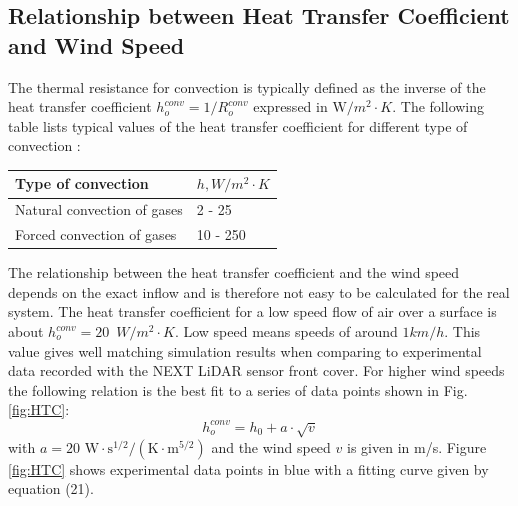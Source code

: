 \subsection{Relationship between Heat Transfer Coefficient and Wind Speed}\label{chapter:windspeedrelation}
The thermal resistance for convection is typically defined as the inverse of the heat transfer coefficient \(h_o^{conv} = 1/R_o^{conv}\) expressed in \(\mathrm{W}/m^2\cdot K\). The following table lists typical values of the heat transfer coefficient for different type of convection \cite{Cengel2002}: 

\begin{table} [H]
\centering
\color{B}
\begin{tabular} [h] {  p{50mm} p{27mm} }
Type of convection & $h, \unit{W/{m^2\cdot K}}$ \\ \hline
Natural convection of gases & 2 - 25 \\ 
Forced convection of gases & 10 - 250 
\end{tabular}
\end{table}
The relationship between the heat transfer coefficient and the wind speed depends on the exact inflow and is therefore not easy to be calculated for the real system. The heat transfer coefficient for a low speed flow of air over a surface is about \(h_o^{conv} = 20 \,\,\,\unit{W/m^2\cdot K}\). Low speed means speeds of around $1 \unit{km/h}$. This value gives well matching simulation results when comparing to experimental data recorded with the NEXT LiDAR sensor front cover. For higher wind speeds the following relation is the best fit to a series of data points shown in Fig. \ref{fig:HTC}: 
\begin{equation}
h_o^{conv} = h_0 + a\cdot \sqrt{v}
\end{equation}
with \(a = 20 \, \,\mathrm{W\cdot s^{1/2}/(K\cdot m^{5/2})}\) and the wind speed $v$ is given in m/s. 
Figure \ref{fig:HTC} shows experimental data points in blue with a fitting curve given by equation (21). 
